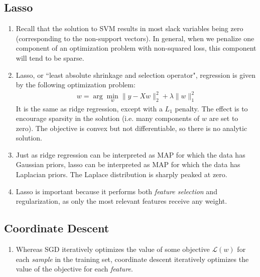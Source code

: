 \documentclass[10pt]{article}
\begin{document}
\begin{multicols}{2}
\begin{addmargin}[0.8em]{0.5em}
    \subsection{Lasso}
    \begin{enumerate}[label=(\alph*)]
        \item Recall that the solution to SVM results in most slack variables being zero (corresponding to the non-support vectors). In general, when we penalize one component of an optimization problem with non-squared loss, this component will tend to be sparse.
        
        \item Lasso, or ``least absolute shrinkage and selection operator", regression is given by the following optimization problem:
        \begin{align*}
        w = \arg\min_{w} \| y - X w \|_2^2 + \lambda \| w \|_1^2
        \end{align*}
        It is the same as ridge regression, except with a $L_1$ penalty. The effect is to encourage sparsity in the solution (i.e. many components of $w$ are set to zero). The objective is convex but not differentiable, so there is no analytic solution.
        
        \item Just as ridge regression can be interpreted as MAP for which the data has Gaussian priors, lasso can be interpreted as MAP for which the data has Laplacian priors. The Laplace distribution is sharply peaked at zero.
        
        \item Lasso is important because it performs both \textit{feature selection} and regularization, as only the most relevant features receive any weight. 
    \end{enumerate}   
    
    \subsection{Coordinate Descent}
    \begin{enumerate}[label=(\alph*)]
        \item Whereas SGD iteratively optimizes the value of some objective $\mathcal{L}(w)$ for each \textit{sample} in the training set, coordinate descent iteratively optimizes the value of the objective for each \textit{feature}. 
        

\end{enumerate}
\end{addmargin}
\end{multicols}
\end{document}
